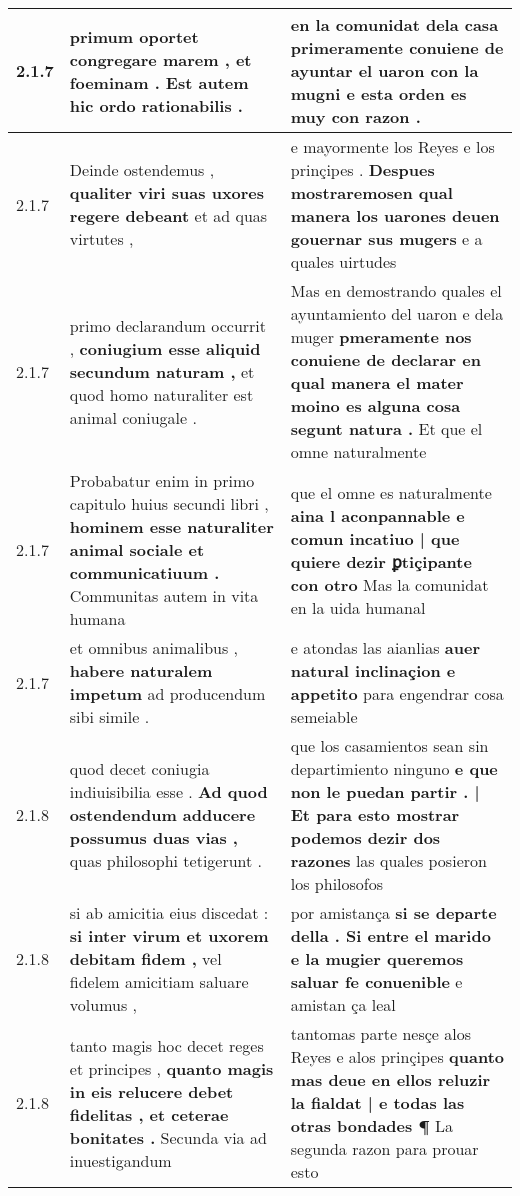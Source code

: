 \begin{tabular}{|p{1cm}|p{6.5cm}|p{6.5cm}|}
2.1.7 & primum oportet \textbf{ congregare marem , et foeminam . } Est autem hic ordo rationabilis . & en la comunidat dela casa \textbf{ primeramente conuiene de ayuntar el uaron con la mugni } e esta orden es muy con razon . \\\hline
2.1.7 & Deinde ostendemus , \textbf{ qualiter viri suas uxores regere debeant } et ad quas virtutes , & e mayormente los Reyes e los prinçipes . \textbf{ Despues mostraremosen qual manera los uarones deuen gouernar sus mugers } e a quales uirtudes \\\hline
2.1.7 & primo declarandum occurrit , \textbf{ coniugium esse aliquid secundum naturam , } et quod homo naturaliter est animal coniugale . & Mas en demostrando quales el ayuntamiento del uaron e dela muger \textbf{ pmeramente nos conuiene de declarar en qual manera el mater moino es alguna cosa segunt natura . } Et que el omne naturalmente \\\hline
2.1.7 & Probabatur enim in primo capitulo huius secundi libri , \textbf{ hominem esse naturaliter animal sociale et communicatiuum . } Communitas autem in vita humana & que el omne es naturalmente \textbf{ aina l aconpannable e comun incatiuo | que quiere dezir ꝑtiçipante con otro } Mas la comunidat en la uida humanal \\\hline
2.1.7 & et omnibus animalibus , \textbf{ habere naturalem impetum } ad producendum sibi simile . & e atondas las aianlias \textbf{ auer natural inclinaçion e appetito } para engendrar cosa semeiable \\\hline
2.1.8 & quod decet coniugia indiuisibilia esse . \textbf{ Ad quod ostendendum adducere possumus duas vias , } quas philosophi tetigerunt . & que los casamientos sean sin departimiento ninguno \textbf{ e que non le puedan partir . | Et para esto mostrar podemos dezir dos razones } las quales posieron los philosofos \\\hline
2.1.8 & si ab amicitia eius discedat : \textbf{ si inter virum et uxorem debitam fidem , } vel fidelem amicitiam saluare volumus , & por amistança \textbf{ si se departe della . Si entre el marido e la mugier queremos saluar fe conuenible } e amistan ça leal \\\hline
2.1.8 & tanto magis hoc decet reges et principes , \textbf{ quanto magis in eis relucere debet fidelitas , et ceterae bonitates . } Secunda via ad inuestigandum & tantomas parte nesçe alos Reyes e alos prinçipes \textbf{ quanto mas deue en ellos reluzir la fialdat | e todas las otras bondades ¶ } La segunda razon para prouar esto \\\hline

\end{tabular}
